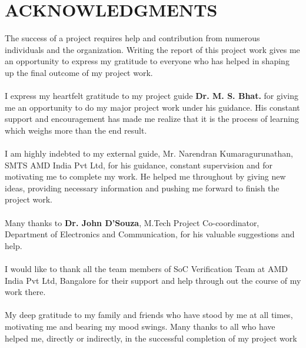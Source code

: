 \section*{\centering ACKNOWLEDGMENTS}
The success of a project requires help and contribution from numerous individuals and 
the organization. Writing the report of this project work gives me an opportunity to 
express my gratitude to everyone who has helped in shaping up the final outcome of my 
project work.
 \paragraph{} I express my heartfelt gratitude to my project guide {\bf Dr. M. S. Bhat.} for 
giving me an opportunity to do my major project work under his guidance. His constant 
support and encouragement has made me realize that it is the process of learning which 
weighs more than the end result.

\paragraph{}I am highly indebted to my external guide, Mr. Narendran Kumaragurunathan, SMTS AMD India Pvt Ltd, for
his guidance, constant supervision and for motivating me to complete my work.
He helped me throughout by giving new ideas, providing necessary information and
pushing me forward to finish the project work. 

\paragraph{} Many thanks to {\bf Dr. John D'Souza}, M.Tech Project Co-coordinator, Department of 
Electronics and Communication, for his valuable suggestions and help.
\paragraph{} I would like to thank all the team members of SoC Verification Team at AMD India Pvt Ltd, Bangalore for their support and help through out the course of my work there.
\paragraph{} My deep gratitude to my family and friends who have stood by me at all times, motivating 
me and bearing my mood swings. Many thanks to all who have helped me, directly or indirectly, in 
the successful completion of my project work
